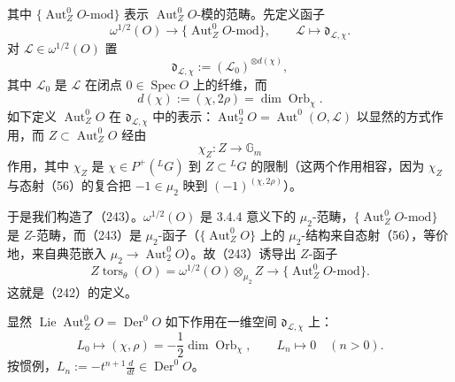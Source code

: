 其中 $\{\operatorname{Aut}^0_Z O\text{-mod}\}$ 表示 $\operatorname{Aut}^0_Z O$-模的范畴。先定义函子
\begin{equation}\tag{243}
\omega^{1/2}(O)\to\{\operatorname{Aut}^0_Z O\text{-mod}\},\qquad \mathcal{L}\mapsto\mathfrak{d}_{\mathcal{L},\chi}.
\end{equation}
对 $\mathcal{L}\in\omega^{1/2}(O)$ 置
\begin{equation}\tag{244}
\mathfrak{d}_{\mathcal{L},\chi}:=(\mathcal{L}_0)^{\otimes d(\chi)},
\end{equation}
其中 $\mathcal{L}_0$ 是 $\mathcal{L}$ 在闭点 $0\in\operatorname{Spec}O$ 上的纤维，而
\begin{equation}\tag{245}
d(\chi):=(\chi,2\rho)=\dim\operatorname{Orb}_\chi.
\end{equation}
如下定义 $\operatorname{Aut}^0_Z O$ 在 $\mathfrak{d}_{\mathcal{L},\chi}$ 中的表示：$\operatorname{Aut}^0_2 O=\operatorname{Aut}^0(O,\mathcal{L})$ 以显然的方式作用，而 $Z\subset\operatorname{Aut}^0_Z O$ 经由
\begin{equation}\tag{246}
\chi_Z:Z\to\mathbb{G}_m
\end{equation}
作用，其中 $\chi_Z$ 是 $\chi\in P^+({}^{L}G)$ 到 $Z\subset{}^{L}G$ 的限制（这两个作用相容，因为 $\chi_Z$ 与态射（56）的复合把 $-1\in\mu_2$ 映到 $(-1)^{(\chi,2\rho)}$）。

于是我们构造了（243）。$\omega^{1/2}(O)$ 是 3.4.4 意义下的 $\mu_2$-范畴，$\{\operatorname{Aut}^0_Z O\text{-mod}\}$ 是 $Z$-范畴，而（243）是 $\mu_2$-函子（$\{\operatorname{Aut}^0_Z O\}$ 上的 $\mu_2$-结构来自态射（56），等价地，来自典范嵌入 $\mu_2\to\operatorname{Aut}^0_2 O$）。故（243）诱导出 $Z$-函子
\[
Z\operatorname{tors}_\theta(O)=\omega^{1/2}(O)\otimes_{\mu_2}Z\to\{\operatorname{Aut}^0_Z O\text{-mod}\}.
\]
这就是（242）的定义。

 显然 $\operatorname{Lie}\operatorname{Aut}^0_Z O=\operatorname{Der}^0 O$ 如下作用在一维空间 $\mathfrak{d}_{\mathcal{L},\chi}$ 上：
\begin{equation}\tag{247}
L_0\mapsto(\chi,\rho)=-\frac{1}{2}\dim\operatorname{Orb}_\chi,\qquad L_n\mapsto0\quad(n>0).
\end{equation}
按惯例，$L_n:=-t^{n+1}\frac{d}{dt}\in\operatorname{Der}^0 O$。


